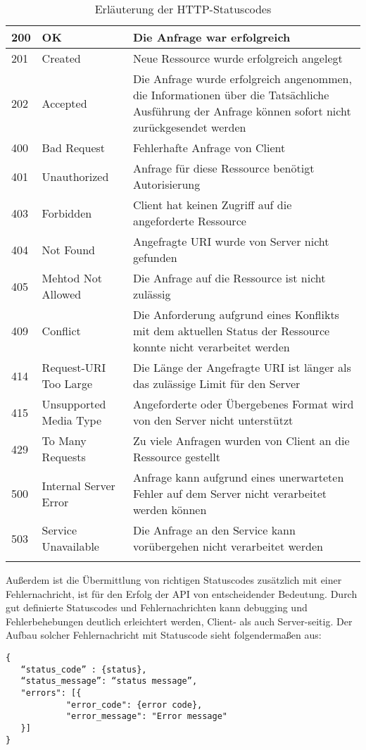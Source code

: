   \begin{longtable}[c]{| p{} | p{} | p{} |}
   \hline
    200 &		  OK						& Die Anfrage war erfolgreich
    \\ \hline
    201	&		  Created				& Neue Ressource wurde erfolgreich angelegt
    \\ \hline
    202	&		  Accepted				& Die Anfrage wurde erfolgreich angenommen, die Informationen über die Tatsächliche Ausführung der Anfrage können sofort nicht zurückgesendet werden
    \\ \hline
    400	&		  Bad Request			& Fehlerhafte Anfrage von Client
    \\ \hline
    401	&		  Unauthorized			& Anfrage für diese Ressource benötigt Autorisierung
	\\ \hline
    403	&		  Forbidden				& Client hat keinen Zugriff auf die angeforderte Ressource
    \\ \hline
    404	&		  Not Found				& Angefragte URI wurde von Server nicht gefunden
    \\ \hline
    405	&		  Mehtod Not Allowed		& Die Anfrage auf die Ressource ist nicht zulässig
    \\ \hline
    409	&		  Conflict				& Die Anforderung aufgrund eines Konflikts mit dem aktuellen Status der Ressource konnte nicht verarbeitet werden
    \\ \hline
    414	&		  Request-URI Too Large	& Die Länge der Angefragte URI ist länger als das zulässige Limit für den Server
    \\ \hline
    415	&		  Unsupported Media Type	& Angeforderte oder Übergebenes Format wird von den Server nicht unterstützt
	\\ \hline
    429	&		  To Many Requests		& Zu viele Anfragen wurden von Client an die Ressource gestellt
    \\ \hline
    500	&		  Internal Server Error	& Anfrage kann aufgrund eines unerwarteten Fehler auf dem Server nicht verarbeitet werden können
    \\ \hline
    503	&		  Service Unavailable	& Die Anfrage an den Service kann vorübergehen nicht verarbeitet werden
    \\ \hline
\caption[HTTP-Statuscodes]{Erläuterung der HTTP-Statuscodes} 
\label{tab:status}
  \end{longtable}

Außerdem ist die Übermittlung von richtigen Statuscodes zusätzlich mit einer Fehlernachricht, ist für den Erfolg der API von entscheidender Bedeutung. Durch gut definierte Statuscodes und Fehlernachrichten kann debugging und Fehlerbehebungen deutlich erleichtert werden, Client- als auch Server-seitig. Der Aufbau solcher Fehlernachricht mit Statuscode sieht folgendermaßen aus:
\begin{verbatim}
{ 
   “status_code” : {status}, 
   “status_message”: “status message”, 
   "errors": [{ 
            "error_code": {error code}, 
            "error_message": "Error message" 
   }] 
} 
\end{verbatim}

